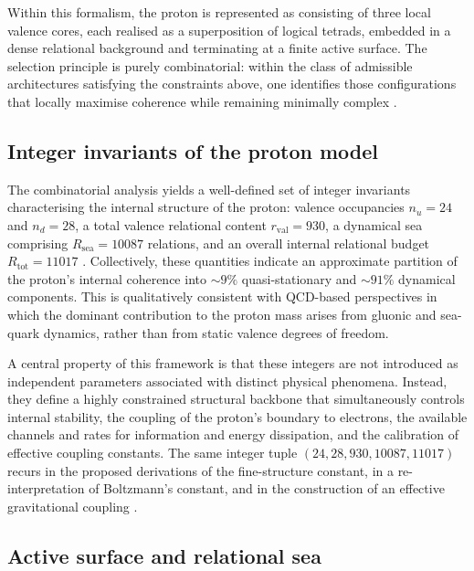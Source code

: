 \documentclass{article}
\begin{document}
Within this formalism, the proton is represented as consisting of three local valence cores, each realised as a superposition of logical tetrads, embedded in a dense relational background and terminating at a finite active surface. The selection principle is purely combinatorial: within the class of admissible architectures satisfying the constraints above, one identifies those configurations that locally maximise coherence while remaining minimally complex \citep{Combinatorial_Proton_v2_2026,PDL_intro}.

\subsection{Integer invariants of the proton model}
\label{subsec:proton_integers}

The combinatorial analysis yields a well-defined set of integer invariants characterising the internal structure of the proton: valence occupancies \(n_u = 24\) and \(n_d = 28\), a total valence relational content \(r_{\mathrm{val}} = 930\), a dynamical sea comprising \(R_{\mathrm{sea}} = 10087\) relations, and an overall internal relational budget \(R_{\mathrm{tot}} = 11017\) \citep{Combinatorial_Proton_v2_2026,PDL_intro}. Collectively, these quantities indicate an approximate partition of the proton’s internal coherence into \(\sim 9\%\) quasi-stationary and \(\sim 91\%\) dynamical components. This is qualitatively consistent with QCD-based perspectives in which the dominant contribution to the proton mass arises from gluonic and sea-quark dynamics, rather than from static valence degrees of freedom.

A central property of this framework is that these integers are not introduced as independent parameters associated with distinct physical phenomena. Instead, they define a highly constrained structural backbone that simultaneously controls internal stability, the coupling of the proton’s boundary to electrons, the available channels and rates for information and energy dissipation, and the calibration of effective coupling constants. The same integer tuple \((24,28,930,10087,11017)\) recurs in the proposed derivations of the fine-structure constant, in a re-interpretation of Boltzmann’s constant, and in the construction of an effective gravitational coupling \citep{PDL_intro,Alpha_PDL_v2_2026,Born_Golden_v2_2026}.

\subsection{Active surface and relational sea}
\label{subsec:active_surface}
\end{document}
